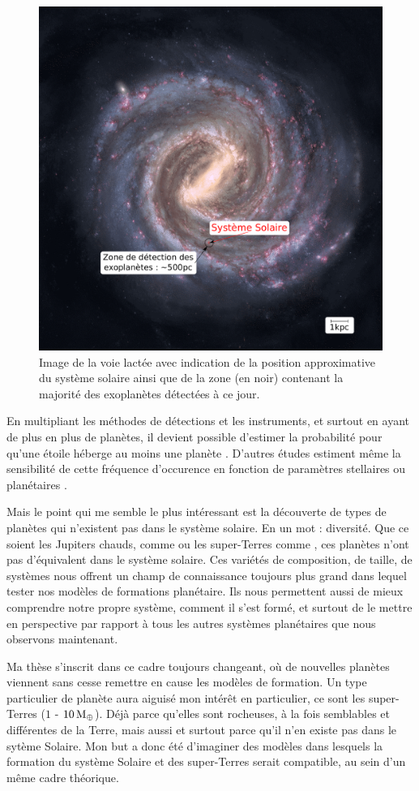 \begin{figure}[htb]
\centering
\includegraphics[width=0.45\linewidth]{figure/milky_way_exoplanets.pdf}
\caption{Image de la voie lactée avec indication de la position approximative du système solaire ainsi que de la zone (en noir) contenant la majorité des exoplanètes détectées à ce jour.}\label{fig:milky_way_exoplanet}
\end{figure}


En multipliant les méthodes de détections et les instruments, et surtout en ayant de plus en plus de planètes, il devient possible d'estimer la probabilité pour qu'une étoile héberge au moins une planète \citep{mayor2011road}. D'autres études estiment même la sensibilité de cette fréquence d'occurence en fonction de paramètres stellaires \citep{fischer2005planet, johnson2007new, howard2012occurrence} ou planétaires \citep{mayor2011road, howard2010occurrence}. 

Mais le point qui me semble le plus intéressant est la découverte de types de planètes qui n'existent pas dans le système solaire. En un mot : diversité. Que ce soient les Jupiters chauds, comme  ou les super-Terres comme , ces planètes n'ont pas d'équivalent dans le système solaire. Ces variétés de composition, de taille, de systèmes nous offrent un champ de connaissance toujours plus grand dans lequel tester nos modèles de formations planétaire. Ils nous permettent aussi de mieux comprendre notre propre système, comment il s'est formé, et surtout de le mettre en perspective par rapport à tous les autres systèmes planétaires que nous observons maintenant.

Ma thèse s'inscrit dans ce cadre toujours changeant, où de nouvelles planètes viennent sans cesse remettre en cause les modèles de formation. Un type particulier de planète aura aiguisé mon intérêt en particulier, ce sont les super-Terres ($1$ - $10\mathrm{\thinspace M_\oplus}$). Déjà parce qu'elles sont rocheuses, à la fois semblables et différentes de la Terre, mais aussi et surtout parce qu'il n'en existe pas dans le sytème Solaire. Mon but a donc été d'imaginer des modèles dans lesquels la formation du système Solaire et des super-Terres serait compatible, au sein d'un même cadre théorique.

